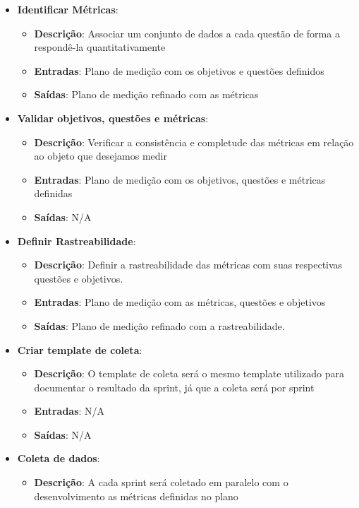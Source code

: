 \begin{itemize}
\begin{itemize}
  \end{itemize}
  \item \textbf{Identificar Métricas}:
  \begin{itemize}
    \item \textbf{Descrição}: Associar um conjunto de dados a cada questão de forma a respondê-la quantitativamente
    \item \textbf{Entradas}: Plano de medição com os objetivos e questões definidos
    \item \textbf{Saídas}: Plano de medição refinado com as métricas
  \end{itemize}
  \item \textbf{Validar objetivos, questões e métricas}:
  \begin{itemize}
    \item \textbf{Descrição}: Verificar a consistência e completude das métricas em relação ao objeto que desejamos medir
    \item \textbf{Entradas}: Plano de medição com os objetivos, questões e métricas definidas
    \item \textbf{Saídas}: N/A
  \end{itemize}
  \item \textbf{Definir Rastreabilidade}:
  \begin{itemize}
    \item \textbf{Descrição}: Definir a rastreabilidade das métricas com suas respectivas questões e objetivos.
    \item \textbf{Entradas}: Plano de medição com as métricas, questões e objetivos
    \item \textbf{Saídas}: Plano de medição refinado com a rastreabilidade.
  \end{itemize}
  \item \textbf{Criar template de coleta}:
  \begin{itemize}
    \item \textbf{Descrição}: O template de coleta será o mesmo template utilizado para documentar o resultado da sprint,
    já que a coleta será por sprint
    \item \textbf{Entradas}: N/A
    \item \textbf{Saídas}: N/A
  \end{itemize}
  \item \textbf{Coleta de dados}:
  \begin{itemize}
    \item \textbf{Descrição}: A cada sprint será coletado em paralelo com o desenvolvimento as métricas definidas no plano

\end{itemize}
\end{itemize}
